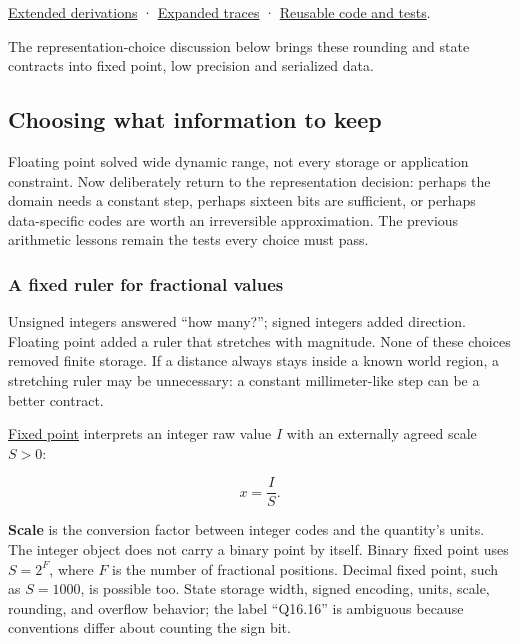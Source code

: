 \hyperref[01-foundations-i-ch011-m005---representation-error-cancellation-and-rounding-graphs]{Extended derivations} · \hyperref[appendix-92ff77d4dfdc-m005---rounding-paths-and-update-history]{Expanded traces} · \hyperref[appendix-4e2236f53445-m005---strict-arithmetic-and-state-update-laboratory]{Reusable code and tests}.

The representation-choice discussion below brings these rounding and state contracts into fixed point, low precision and serialized data.

\subsection{Choosing what information to keep}\label{05-engine-i-ch001-choosing-what-information-to-keep}

Floating point solved wide dynamic range, not every storage or application constraint. Now deliberately return to the representation decision: perhaps the domain needs a constant step, perhaps sixteen bits are sufficient, or perhaps data-specific codes are worth an irreversible approximation. The previous arithmetic lessons remain the tests every choice must pass.

\subsubsection{A fixed ruler for fractional values}\label{05-engine-i-ch001-a-fixed-ruler-for-fractional-values}

Unsigned integers answered ``how many?''; signed integers added direction. Floating point added a ruler that stretches with magnitude. None of these choices removed finite storage. If a distance always stays inside a known world region, a stretching ruler may be unnecessary: a constant millimeter-like step can be a better contract.

\hyperref[appendix-1d0dbe8924cc]{Fixed point} interprets an integer raw value \(I\) with an externally agreed scale \(S>0\):

\[
x=\frac{I}{S}.
\]

\textbf{Scale} is the conversion factor between integer codes and the quantity's units. The integer object does not carry a binary point by itself. Binary fixed point uses \(S=2^F\), where \(F\) is the number of fractional positions. Decimal fixed point, such as \(S=1000\), is possible too. State storage width, signed encoding, units, scale, rounding, and overflow behavior; the label ``Q16.16'' is ambiguous because conventions differ about counting the sign bit.


